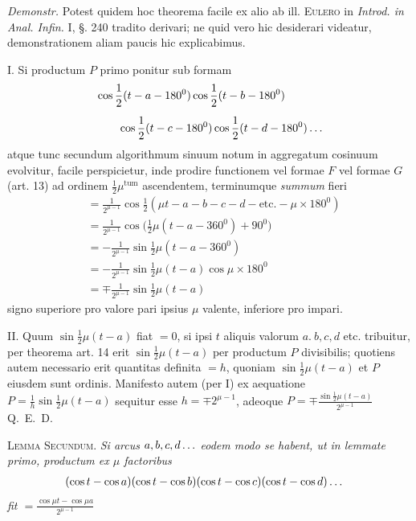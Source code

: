 \emph{Demonstr.} Potest quidem hoc theorema facile ex alio ab ill. \textsc{Eulero} in \emph{Introd. in Anal. Infin.} I, \S. 240 tradito derivari; ne quid vero hic desiderari videatur, demonstrationem aliam paucis hic explicabimus.

I. Si productum \(P\) primo ponitur sub formam
\[
\begin{aligned}
&\cos\frac12(t-a-180^{0})\cos\frac12(t-b-180^{0})\\[5pt]&\qquad\cos\frac12(t-c-180^{0})\cos\frac12(t-d-180^{0})\mathinner{.\,.\,.}
\end{aligned}
\]
\noindent atque tunc secundum algorithmum sinuum notum in aggregatum cosinuum evolvitur, facile perspicietur, inde prodire functionem vel formae \(F\) vel formae \(G\) 
(art. 13) ad ordinem \(\frac12\mu^{\mathrm{tum}}\) ascendentem, terminumque \emph{summum} fieri
\[
\begin{aligned}
&=\frac{1}{2^{\mu-1}}\cos\frac12(\mu t-a-b-c-d-\mathrm{etc.}-\mu\times180^{0})\\[5pt]
&=\frac{1}{2^{\mu-1}}\cos\bigl(\frac12\mu(t-a-360^{0})+90^{0}\bigr)\\[5pt]
&=-\frac{1}{2^{\mu-1}}\sin\frac12\mu(t-a-360^{0})\\[5pt]
&=-\frac{1}{2^{\mu-1}}\sin\frac12\mu(t-a)\cos\mu\times180^{0}\\[5pt]
&=\mp\frac{1}{2^{\mu-1}}\sin\frac12\mu(t-a)
\end{aligned}
\]
\noindent signo superiore pro valore pari ipsius \(\mu\) valente, inferiore pro impari.

II. Quum \(\sin\frac12\mu(t-a)\) fiat \(=0\), si ipsi \(t\) aliquis valorum \(a.\ b,c,d\) etc. 
tribuitur, per theorema art. 14 erit \(\sin\frac12\mu(t-a)\) per productum \(P\) divisibilis; 
quotiens autem necessario erit quantitas definita \(=h\), quoniam \(\sin\frac12\mu(t-a)\) et \(P\) 
eiusdem sunt ordinis. Manifesto autem (per I) ex aequatione \(P=\frac1h\sin\frac12\mu(t-a)\) 
sequitur esse \(h=\mp2^{\mu-1}\), adeoque \(P=\mp\frac{\sin\frac12\mu(t-a)}{2^{\mu-1}}\)\quad Q.~E.~D.

\textsc{Lemma Secundum.} \emph{Si arcus \(a,b,c,d\mathinner{.\,.\,.}\) eodem modo se habent, ut in lemmate primo, productum ex \(\mu\) factoribus}
\[
\begin{aligned}
&(\cos t-\cos a)(\cos t-\cos b)(\cos t-\cos c)(\cos t-\cos d)\mathinner{.\,.\,.}
\end{aligned}
\]
\noindent\emph{fit \(=\frac{\cos\mu t-\cos\mu a}{2^{\mu-1}}\)}

